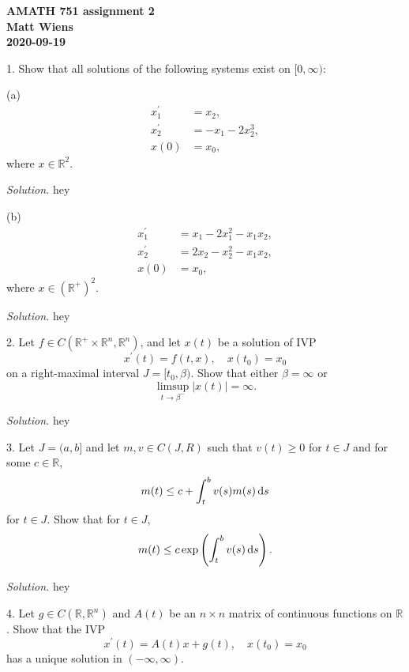 \documentclass{article}
\newcommand{\R}{\mathbb{R}}
\begin{document}
\textbf{AMATH 751 assignment 2} \\
\textbf{Matt Wiens} \\
\textbf{2020-09-19}

1. Show that all solutions of the following systems exist on $[0, \infty)$:

(a)
%
\begin{align*}
    x_1^\prime &= x_2, \\
    x_2^\prime &= -x_1 - 2 x_2^3, \\
    x(0) &= x_0,
\end{align*}
%
where $x \in \R^2$.

\textit{Solution.}
hey

\vspace{5mm}

(b)
%
\begin{align*}
    x_1^\prime &= x_1 - 2 x_1^2 - x_1 x_2, \\
    x_2^\prime &= 2 x_2 - x_2^2 - x_1 x_2, \\
    x(0) &= x_0,
\end{align*}
%
where $x \in (\R^+)^2$.

\textit{Solution.}
hey

\newpage

2. Let $f \in C(\R^+ \times \R^n, \R^n)$, and let $x(t)$ be a solution of IVP
%
\begin{equation*}
    x^\prime(t) = f(t, x), \quad x(t_0) = x_0
\end{equation*}
%
on a right-maximal interval $J = [t_0, \beta)$. Show that either $\beta = \infty$
or
%
\begin{equation*}
    \limsup_{t \to \beta^-} |x(t)| = \infty.
\end{equation*}

\textit{Solution.}
hey

\newpage

3. Let $J = (a, b]$ and let $m, v \in C(J, R)$ such that $v(t) \geq 0$ for
$t \in J$ and for some $c \in \R$,
%
\begin{equation*}
    m(t) \leq c + \int_t^b v(s) m(s) \dif s
\end{equation*}
%
for $t \in J$. Show that for $t \in J$,
%
\begin{equation*}
    m(t) \leq c \exp\del{\int_t^b v(s) \dif s}.
\end{equation*}

\textit{Solution.}
hey

\newpage

4. Let $g \in C(\R, \R^n)$ and $A(t)$ be an $n \times n$ matrix of continuous functions on $\R$.
Show that the IVP
%
\begin{equation*}
    x^\prime(t) = A(t) x + g(t), \quad x(t_0) = x_0
\end{equation*}
%
has a unique solution in $(-\infty, \infty)$.
\end{document}
